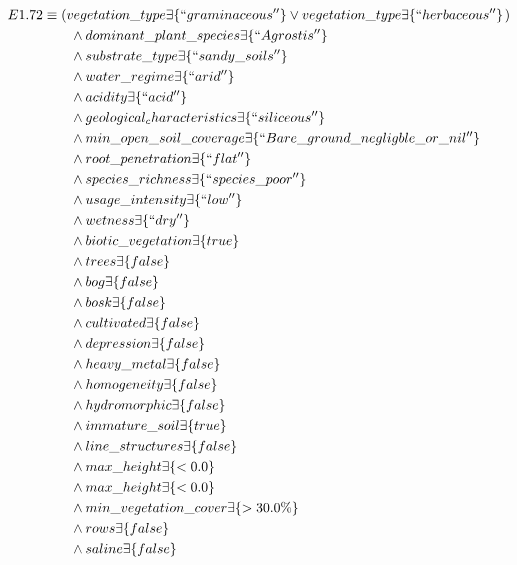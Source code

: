 \documentclass[authoryear, review,12pt,number]{elsarticle}
\begin{document}
\begin{align*}
E1.72 &\equiv \left( vegetation\_type \exists \{``graminaceous''\}
    \lor vegetation\_type \exists \{``herbaceous''\} \right.)\\
    &\qquad {} \land dominant\_plant\_species \exists \{``Agrostis'' \} \\
    &\qquad {} \land substrate\_type \exists \{``sandy\_soils''\} \\
    &\qquad {} \land water\_regime \exists \{``arid''\} \\
    &\qquad {} \land acidity \exists \{``acid''\} \\
    &\qquad {} \land geological_characteristics \exists \{``siliceous''\}\\
    &\qquad \land min\_open\_soil\_coverage \exists
    \{``Bare\_ground\_negligble\_or\_nil''\} \nonumber \\
     &\qquad {} \land root\_penetration \exists \{``flat''\} \\
    &\qquad {} \land species\_richness \exists \{``species\_poor''\}\\
    &\qquad {} \land usage\_intensity \exists  \{``low''\} \\
    &\qquad {} \land wetness \exists \{``dry''\} \\ 
    &\qquad {} \land biotic\_vegetation \exists \{true\}\\
    &\qquad {} \land trees \exists \{false\} \\
    &\qquad {} \land bog \exists \{false\}\\
    &\qquad {} \land bosk \exists \{false\}\\
    &\qquad {} \land cultivated \exists \{false\}\\ 
    &\qquad {} \land depression \exists \{false\}\\  
    &\qquad {} \land heavy\_metal \exists \{false\}\\  
    &\qquad {} \land homogeneity \exists \{false\}\\   
    &\qquad {} \land hydromorphic \exists \{false\}\\  
    &\qquad {} \land immature\_soil \exists \{true\}\\  
    &\qquad {} \land line\_structures \exists \{false\}\\   
    &\qquad {} \land max\_height \exists \{<0.0\}\\   
    &\qquad {} \land max\_height \exists \{<0.0\}\\   
    &\qquad {} \land min\_vegetation\_cover \exists \{>30.0\%\}\\   
    &\qquad {} \land rows \exists \{false\}\\   
    &\qquad {} \land saline \exists \{false\}\\
\end{align*}
\end{document}
